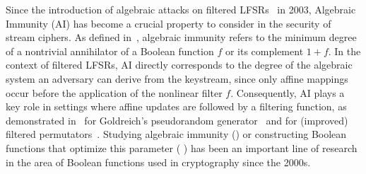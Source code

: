 \documentclass[11pt]{llncs}
\begin{document}





Since the introduction of algebraic attacks on filtered LFSRs~\cite{EC:CouMei03} in 2003, Algebraic Immunity (AI) has become a crucial property to consider in the security of stream ciphers. 
As defined in~\cite{EC:MeiPasCar04}, algebraic immunity refers to the minimum degree of a nontrivial annihilator of a Boolean function $f$ or its complement $1+f$. 
In the context of filtered LFSRs, AI directly corresponds to the degree of the algebraic system an adversary can derive from the keystream, since only affine mappings occur before the application of the nonlinear filter $f$. 
Consequently, AI plays a key role in settings where affine updates are followed by a filtering function, as demonstrated in~\cite{SIAM:AppLov18} for Goldreich's pseudorandom generator~\cite{Goldreich00} and for (improved) filtered permutators~\cite{EC:MJSC16,INDO:MCJS19}. 
Studying algebraic immunity (\eg \cite{IEEE:Didier06,AMC:CarMer13,DAM:Meaux22}) or constructing Boolean functions that optimize this parameter (\eg \cite{INDOCRYPT:DalGupMai04,DCC:DalMaiSar06,ISIT:Carlet07,LiQi07,AC:CarFen08,IEEE:QFLW09,IEEE:CheLu11,IEEE:ZCSH11,DCC:TuDen11,
AC:LiuZhaLin12,IEEE:TanCarTan13,CC:LimKolKal13,DCC:LCZLHS14,IEEE:LiuLin14,TanLuoDu16,IEEE:TCTZ17, DCC:LimKol18,CC:TangLiu19}
) has been an important line of research in the area of Boolean functions used in cryptography since the 2000s. 
%
%
\end{document}
